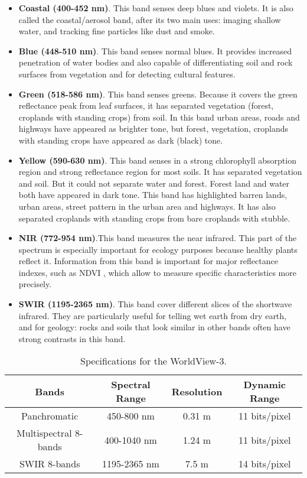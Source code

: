\documentclass[10pt,twocolumn,letterpaper]{article}
\begin{document}
\begin{itemize}
	\item \textbf{Coastal (400-452 nm)}. This band senses deep blues and violets.
	 It is also called the coastal/aerosol band, after its two main uses: imaging shallow water, and tracking fine particles like dust and smoke.

	\item \textbf{Blue (448-510 nm)}. This band senses normal blues. It provides increased penetration of water bodies and also capable of differentiating soil and rock surfaces from vegetation and for detecting cultural features.

	\item \textbf{Green (518-586 nm)}. This band senses greens. Because it covers the green reflectance peak from leaf surfaces, it has separated vegetation (forest, croplands with standing crops) from soil. In this band urban areas, roads and highways have appeared as brighter tone, but forest, vegetation, croplands with standing crops have appeared as dark (black) tone.

	\item \textbf{Yellow (590-630 nm)}. This band senses in a strong chlorophyll absorption region and strong reflectance region for most soils. It has separated vegetation and soil. But it could not separate water and forest. Forest land and water both have appeared in dark tone. This band has highlighted barren lands, urban areas, street pattern in the urban area and highways. It has also separated croplands with standing crops from bare croplands with stubble.

	\item \textbf{NIR (772-954 nm)}.This band measures the near infrared. This part of the spectrum is especially important for ecology purposes because healthy plants reflect it. Information from this band is important for major reflectance indexes, such as NDVI \cite{ndvi}, which allow to measure specific characteristics more precisely.

	\item \textbf{SWIR (1195-2365 nm)}. This band cover different slices of the shortwave infrared. They are particularly useful for telling wet earth from dry earth, and for geology: rocks and soils that look similar in other bands often have strong contrasts in this band.
\end{itemize}

\begin{table*}[th]
	\centering
	\begin{tabular}{|c|c|c|c|}
		\hline
		\textbf{Bands} & \textbf{Spectral Range} & \textbf{Resolution} & \textbf{Dynamic Range} \\ \hline
		Panchromatic & 450-800 nm & 0.31 m & 11 bits/pixel\\ \hline
		Multispectral 8-bands & 400-1040 nm & 1.24 m & 11 bits/pixel \\ \hline
		SWIR 8-bands & 1195-2365 nm & 7.5 m & 14 bits/pixel\\ \hline
	\end{tabular}
	\caption{Specifications for the WorldView-3.}
	\label{table:specs}
\end{table*}
\end{document}
